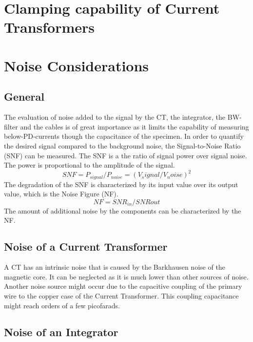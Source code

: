 \section{Clamping capability of Current Transformers }

\section{Noise Considerations}
\subsection{General}
The evaluation of noise added to the signal by the CT, the integrator, the BW-filter and the cables is of great importance as it limits the capability of measuring below-PD-currents though the capacitance of the specimen. 
In order to quantify the desired signal compared to the background noise, the Signal-to-Noise Ratio (SNF) can be measured. The SNF is a the ratio of signal power over signal noise. The power is proportional to the amplitude of the signal.
\begin{equation}
	SNF=P_{signal}/P_{noise} = (V_signal/V_noise)^2
\end{equation}
The degradation of the SNF is characterized by its input value over its output value, which is the Noise Figure (NF).
\begin{equation}
	NF = SNR_{in}/SNR{out}
\end{equation}
The amount of additional noise by the components can be characterized by the NF. 
\subsection{Noise of a Current Transformer}
A CT has an intrinsic noise that is caused by the Barkhausen noise of the magnetic core. It can be neglected as it is much lower than other sources of noise. %
Another noise source might occur due to the capacitive coupling of the primary wire to the copper case of the Current Transformer. This coupling capacitance might reach orders of a few picofarads. %


\subsection{Noise of an Integrator}


